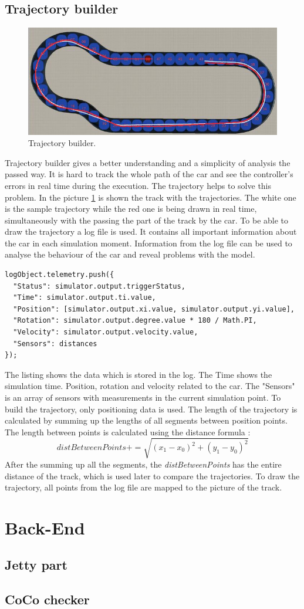 \subsection{Trajectory builder}
\begin{figure}[h!]
    \centering
    \includegraphics[width=0.8\linewidth]{src/pic/trajectory}
    \caption{Trajectory builder.}
    \label{fig:trajectory}
\end{figure}
Trajectory builder gives a better understanding and a simplicity of analysis the passed way. It is hard to track the whole path of the car and see the controller's errors in real time during the execution. The trajectory helps to solve this problem. In the picture \ref{fig:trajectory} is shown the track with the trajectories. The white one is the sample trajectory while the red one is being drawn in real time, simultaneously with the passing the part of the track by the car. To be able to draw the trajectory a log file is used. It contains all important information about the car in each simulation moment. Information from the log file can be used to analyse the behaviour of the car and reveal problems with the model.
\bigskip
\begin{lstlisting}
logObject.telemetry.push({
  "Status": simulator.output.triggerStatus,
  "Time": simulator.output.ti.value,
  "Position": [simulator.output.xi.value, simulator.output.yi.value],
  "Rotation": simulator.output.degree.value * 180 / Math.PI,
  "Velocity": simulator.output.velocity.value,
  "Sensors": distances
});
\end{lstlisting}
\bigskip
The listing shows the data which is stored in the log. The Time shows the simulation time. Position, rotation and velocity related to the car. The "Sensors" is an array of sensors with measurements in the current simulation point. To build the trajectory, only positioning data is used. The length of the trajectory is calculated by summing up the lengths of all segments between position points. The length between points is calculated using the distance formula \cite{Distance}:
\begin{equation}
    distBetweenPoints += \sqrt{(x_1-x_0)^2 + (y_1-y_0)^2}
\end{equation}
After the summing up all the segments, the \textit{distBetweenPoints} has the entire distance of the track, which is used later to compare the trajectories. To draw the trajectory, all points from the log file are mapped to the picture of the track.
\section{Back-End}
\subsection{Jetty part}
\subsection{CoCo checker}
